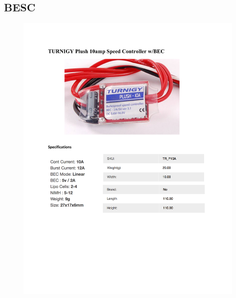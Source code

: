 \documentclass[../main.tex]{subfiles}
\begin{document}
\subsection{BESC \cite{BESC}} \label{BESC}
\begin{figure}[H]
	\centering
	\includegraphics[width=\textwidth]{img/specs/besc_thruster.pdf}
\end{figure}




\end{document}
